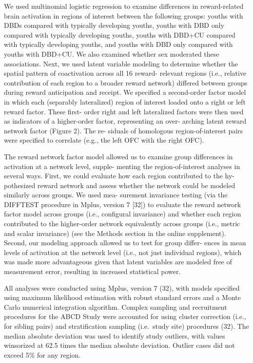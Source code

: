 \documentclass{article}
\begin{document}
We used multinomial logistic regression to examine differences in
reward-related brain activation in regions of interest between the
following groups: youths with DBDs compared with typically developing
youths, youths with DBD only compared with typically developing youths,
youths with DBD+CU compared with typically developing youths, and youths
with DBD only compared with youths with DBD+CU. We also examined whether
sex moderated these associations. Next, we used latent variable modeling
to determine whether the spatial pattern of coactivation across all 16
reward- relevant regions (i.e., relative contribution of each region to
a broader reward network) differed between groups during reward
anticipation and receipt. We specified a second-order factor model in
which each (separably lateralized) region of interest loaded onto a
right or left reward factor. These first- order right and left
lateralized factors were then used as indicators of a higher-order
factor, representing an over- arching latent reward network factor
(Figure 2). The re- siduals of homologous region-of-interest pairs were
specified to correlate (e.g., the left OFC with the right OFC).

The reward network factor model allowed us to examine group differences
in activation at a network level, supple- menting the region-of-interest
analyses in several ways. First, we could evaluate how each region
contributed to the hy- pothesized reward network and assess whether the
network could be modeled similarly across groups. We used mea- surement
invariance testing (via the DIFFTEST procedure in Mplus, version 7
{[}32{]}) to evaluate the reward network factor model across groups
(i.e., configural invariance) and whether each region contributed to the
higher-order network equivalently across groups (i.e., metric and scalar
invariance) (see the Methods section in the online supplement). Second,
our modeling approach allowed us to test for group differ- ences in mean
levels of activation at the network level (i.e., not just individual
regions), which was made more advantageous given that latent variables
are modeled free of measurement error, resulting in increased
statistical power.

All analyses were conducted using Mplus, version 7 (32), with models
specified using maximum likelihood estimation with robust standard
errors and a Monte Carlo numerical integration algorithm. Complex
sampling and recruitment procedures for the ABCD Study were accounted
for using cluster correction (i.e., for sibling pairs) and
stratification sampling (i.e.~study site) procedures (32). The median
absolute deviation was used to identify study outliers, with values
winsorized at 62.5 times the median absolute deviation. Outlier cases
did not exceed 5\% for any region.
\end{document}
